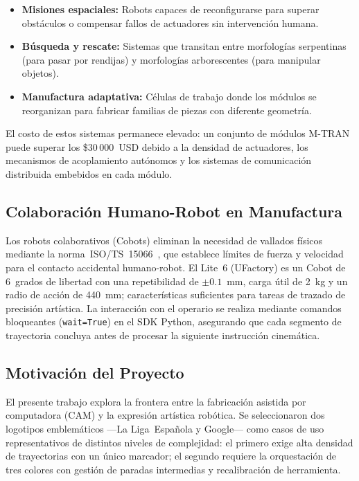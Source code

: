 \documentclass[journal,compsoc]{IEEEtran}
\begin{document}
\begin{itemize}
    \item \textbf{Misiones espaciales:} Robots capaces de reconfigurarse para superar obstáculos o compensar fallos de actuadores sin intervención humana.
    \item \textbf{Búsqueda y rescate:} Sistemas que transitan entre morfologías serpentinas (para pasar por rendijas) y morfologías arborescentes (para manipular objetos).
    \item \textbf{Manufactura adaptativa:} Células de trabajo donde los módulos se reorganizan para fabricar familias de piezas con diferente geometría.
\end{itemize}

El costo de estos sistemas permanece elevado: un conjunto de módulos M-TRAN puede superar los \$30\,000~USD debido a la densidad de actuadores, los mecanismos de acoplamiento autónomos y los sistemas de comunicación distribuida embebidos en cada módulo.

\subsection{Colaboración Humano-Robot en Manufactura}

Los robots colaborativos (Cobots) eliminan la necesidad de vallados físicos mediante la norma~ISO/TS~15066~\cite{iso15066}, que establece límites de fuerza y velocidad para el contacto accidental humano-robot. El Lite~6 (UFactory) es un Cobot de 6~grados de libertad con una repetibilidad de $\pm 0.1$~mm, carga útil de 2~kg y un radio de acción de 440~mm; características suficientes para tareas de trazado de precisión artística. La interacción con el operario se realiza mediante comandos bloqueantes (\texttt{wait=True}) en el SDK Python, asegurando que cada segmento de trayectoria concluya antes de procesar la siguiente instrucción cinemática.

\subsection{Motivación del Proyecto}

El presente trabajo explora la frontera entre la fabricación asistida por computadora (CAM) y la expresión artística robótica. Se seleccionaron dos logotipos emblemáticos ---La Liga~Española y Google--- como casos de uso representativos de distintos niveles de complejidad: el primero exige alta densidad de trayectorias con un único marcador; el segundo requiere la orquestación de tres colores con gestión de paradas intermedias y recalibración de herramienta.
\end{document}
